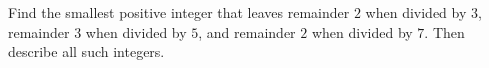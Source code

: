 Find the smallest positive integer that leaves remainder \(2\) when divided by \(3\), remainder \(3\) when divided by \(5\), and remainder \(2\) when divided by \(7\). Then describe all such integers.
